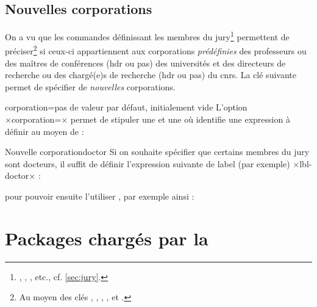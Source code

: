 \subsection{Nouvelles corporations}\label{sec:corporations}

On a vu que les commandes définissant les membres du
jury\footnote{, , , etc.,
  cf. \vref{sec:jury}.} permettent de préciser\footnote{Au moyen des clés
  , , , ,
   et .} si ceux-ci
appartiennent aux corporations \emph{prédéfinies} des professeurs ou des
maîtres de conférences (\gls{hdr} ou pas) des universités et des directeurs de
recherche ou des chargé(e)s de recherche (\gls{hdr} ou pas) du \gls{cnrs}. La
clé  suivante permet de spécifier de \emph{nouvelles}
corporations.

\begin{docKey}{corporation}{=}{pas de
    valeur par défaut, initialement vide}
  L'option ×corporation=× permet de stipuler une
   et une  où  identifie une expression à
  définir au moyen de :
\begin{preamblecode}[title=Par exemple dans le \File{\configurationfile}]
\end{preamblecode}
\end{docKey}

\begin{dbexample}{Nouvelle corporation}{doctor}
  Si on souhaite spécifier que certains membres du jury sont docteurs, il
  suffit de définir  l'expression suivante de label (par
  exemple) ×lbl-doctor× :
\begin{preamblecode}[title=Par exemple dans le \File{\configurationfile}]
\end{preamblecode}
pour pouvoir ensuite l'utiliser , par
exemple ainsi :
\begin{bodycode}
\end{bodycode}
\end{dbexample}

\section{Packages chargés par la \yatcl}

